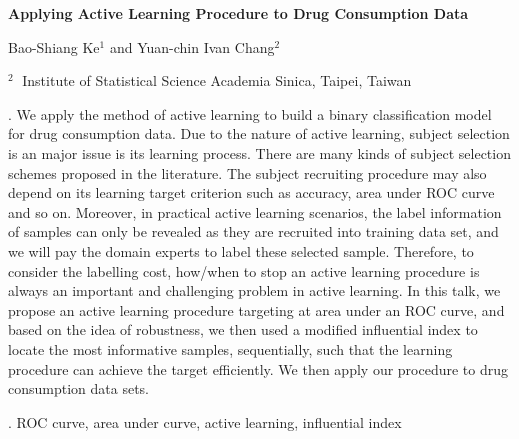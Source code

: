 \documentclass[12pt]{article}
\begin{document}
\begin{flushleft}


{\LARGE\bf Applying Active Learning Procedure to Drug Consumption Data}


\vspace{1.0cm}

Bao-Shiang Ke$^1$ and Yuan-chin Ivan Chang$^2$

\begin{description}

\item $^2 \;$ Institute of Statistical Science Academia Sinica, Taipei, Taiwan

\end{description}

\end{flushleft}


\vspace{0.75cm}

. We apply the method of active learning to build a binary classification model for drug consumption data.
Due to the nature of active learning, subject selection is an major issue is its learning process. There are many kinds of subject selection schemes proposed in the literature. The subject recruiting procedure may also depend on its learning target criterion such as accuracy, area under ROC curve and so on.  Moreover, in practical active learning scenarios, the label information of samples can only be revealed as they are recruited into training data set, and we will pay the domain experts to label these selected sample.  Therefore, to consider the labelling cost, how/when to stop an active learning procedure is always an important and challenging problem in active learning.  In this talk, we propose an active learning procedure targeting at area under an ROC curve, and based on the idea of robustness, we then used a modified influential index to locate the most informative samples, sequentially, such that the learning procedure can achieve the target efficiently. We then apply our procedure to drug consumption data sets.
\vskip 2mm

.
ROC curve, area under curve, active learning, influential index
\end{document}

